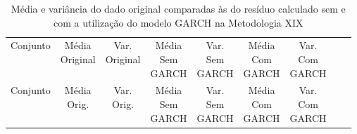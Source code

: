 \clearpage

\begin{center}
\begin{longtable}{ccccccccc}
\toprule
\rowcolor{white}
\caption[Metodologia XIX: dados estatísticos]{Média e variância do dado original
comparadas às do resíduo calculado sem e com a utilização do modelo GARCH na
Metodologia XIX} \label{tab:DadosEstatisticosMet19}\\
\midrule
    Conjunto & \specialcell{Média\\Original} &
    \specialcell{Var.\\Original} & \specialcell{Média\\Sem\\GARCH} &
    \specialcell{Var.\\Sem\\GARCH} & \specialcell{Média\\Com\\GARCH}&
    \specialcell{Var.\\Com\\GARCH} \\

\midrule
\endfirsthead 
\midrule
\rowcolor{white}
    Conjunto & \specialcell{Média\\Orig.} &
    \specialcell{Var.\\Orig.} & \specialcell{Média\\Sem\\GARCH} &
    \specialcell{Var.\\Sem\\GARCH} & \specialcell{Média\\Com\\GARCH}&
    \specialcell{Var.\\Com\\GARCH} \\


\end{longtable}
\end{center}
